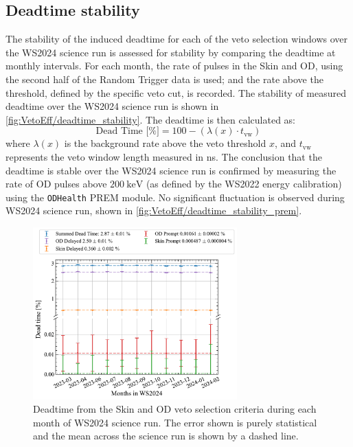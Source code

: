 \subsection{Deadtime stability}\label{sec:VetoEff/DeadtimeStability}
The stability of the induced deadtime for each of the veto selection windows over the WS2024 science run is assessed for stability by comparing the deadtime at monthly intervals. For each month, the rate of pulses in the Skin and OD, using the second half of the Random Trigger data is used; and the rate above the threshold, defined by the specific veto cut, is recorded. The stability of measured deadtime over the WS2024 science run is shown in \autoref{fig:VetoEff/deadtime_stability}.
The deadtime is then calculated as:
\begin{equation}
	\textrm{Dead Time [\%]} = 100 - (\lambda(x)\cdot t_{\text{vw}})
\end{equation}
where $\lambda(x)$ is the background rate above the veto threshold $x$, and $t_{\text{vw}}$ represents the veto window length measured in ns.
The conclusion that the deadtime is stable over the WS2024 science run is confirmed by measuring the rate of OD pulses above $200~\text{keV}$ (as defined by the WS2022 energy calibration) using the \lstinline{ODHealth} PREM module. No significant fluctuation is observed during WS2024 science run, shown in \autoref{fig:VetoEff/deadtime_stability_prem}.
\begin{figure}[!ht]
	\centering
	\includegraphics[width=0.7\textwidth]{figures/VetoEfficiency/SR3DeadTimeAll_withMean.pdf}
	\caption[Deadtime from the Skin and OD veto selection criteria during each month of WS2024 science run.]{Deadtime from the Skin and OD veto selection criteria during each month of WS2024 science run. The error shown is purely statistical and the mean across the science run is shown by a dashed line.}
	\label{fig:VetoEff/deadtime_stability}
\end{figure}
